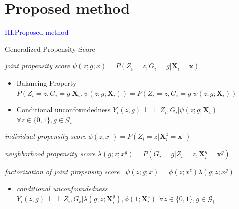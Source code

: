 \documentclass[notes,11pt, aspectratio=169]{beamer}
\begin{document}
\section{Proposed method}
\begin{transitionframe}
  \begin{center}
    { \Huge \textcolor{blue}{III.Proposed method}}
  \end{center}
\end{transitionframe}




\begin{frame}{Generalized Propensity Score}
\begin{wideitemize}
    \item \emph{joint propensity score} \qquad \quad $\psi(z;g;x)=P(Z_i=z,G_i=g | \mathbf{X}_i = \mathbf{x})$
    \vspace{1em}
    \begin{itemize}
        \item Balancing Property $P(Z_i=z,G_i=g|\mathbf{X}_i,\psi(z;g;\mathbf{X}_i))=P(Z_i=z,G_i=g|\psi(z;g;\mathbf{X}_i))$
        \vspace{1em}
        \item Conditional unconfoundedness $Y_i(z,g) \perp\!\!\!\perp Z_i,G_i|\psi(z;g;\mathbf{X}_i)$ $\forall z \in \{0,1\} , g \in \mathcal{G}_i $
    \end{itemize}
    \item \emph{individual propensity score} \qquad $\phi(z;x^z)=P(Z_i=z | \mathbf{X}_{i}^{z}=\mathbf{x}^z)$
    \item \emph{neighborhood propensity score} \quad $\lambda(g;z;x^g)=P(G_i=g |Z_i=z , \mathbf{X}_{i}^{g}=\mathbf{x}^g)$
    \item \emph{factorization of joint propensity score} \ $\psi(z;g;x)=\phi(z;x^z) \lambda(g;z;x^g)$
    \vspace{1em}
    \begin{itemize}
        \item \emph{conditional unconfoundedness}\\
        \vspace{1em}
        $Y_i(z,g) \perp\!\!\!\perp Z_i,G_i| \lambda(g;z;\mathbf{X}_{i}^g), \phi(1;\mathbf{X}_{i}^z) $ \quad $\forall z \in \{0,1\} , g \in \mathcal{G}_i $
    \end{itemize}
\end{wideitemize}
\end{frame}
\end{document}
